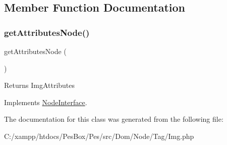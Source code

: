 \subsection{Member Function Documentation}
\mbox{\label{class_pes_1_1_dom_1_1_node_1_1_tag_1_1_img_a4722e7722b245351681b05d35f6694f3}} 
\subsubsection{\texorpdfstring{get\+Attributes\+Node()}{getAttributesNode()}}
{\footnotesize\ttfamily get\+Attributes\+Node (\begin{DoxyParamCaption}{ }\end{DoxyParamCaption})}

\begin{DoxyReturn}{Returns}
Img\+Attributes 
\end{DoxyReturn}


Implements \mbox{\hyperlink{interface_pes_1_1_dom_1_1_node_1_1_node_interface_a4722e7722b245351681b05d35f6694f3}{Node\+Interface}}.



The documentation for this class was generated from the following file\+:\begin{DoxyCompactItemize}
\item 
C\+:/xampp/htdocs/\+Pes\+Box/\+Pes/src/\+Dom/\+Node/\+Tag/Img.\+php\end{DoxyCompactItemize}
